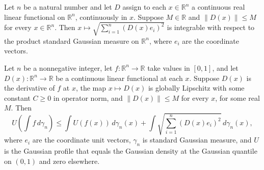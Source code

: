 \begin{lemma}
\leanok
{}
Let $n$ be a natural number and let $D$ assign to each $x\in\mathbb R^n$ a continuous
real linear functional on $\mathbb R^n$, continuously in $x$. Suppose $M\in\mathbb R$
and $\|D(x)\|\le M$ for every $x\in\mathbb R^n$. Then $x\mapsto\sqrt{\sum_{i=1}^n
(D(x)e_i)^2}$ is integrable with respect to the product standard Gaussian measure on
$\mathbb R^n$, where $e_i$ are the coordinate vectors.
\end{lemma}

\begin{lemma}
\leanok
{}
Let $n$ be a nonnegative integer, let $f:\mathbb R^n\to\mathbb R$ take values in
$[0,1]$, and let $D(x):\mathbb R^n\to\mathbb R$ be a continuous linear functional at
each $x$. Suppose $D(x)$ is the derivative of $f$ at $x$, the map $x\mapsto D(x)$ is
globally Lipschitz with some constant $C\ge0$ in operator norm, and $\|D(x)\|\le M$ for
every $x$, for some real $M$. Then
\[
U\!\left(\int f\,d\gamma_n\right)\le \int
U(f(x))\,d\gamma_n(x)+\int\sqrt{\sum_{i=1}^n(D(x)e_i)^2}\,d\gamma_n(x),
\]
where $e_i$ are the coordinate unit vectors, $\gamma_n$ is standard Gaussian measure,
and $U$ is the Gaussian profile that equals the Gaussian density at the Gaussian
quantile on $(0,1)$ and zero elsewhere.
\end{lemma}
